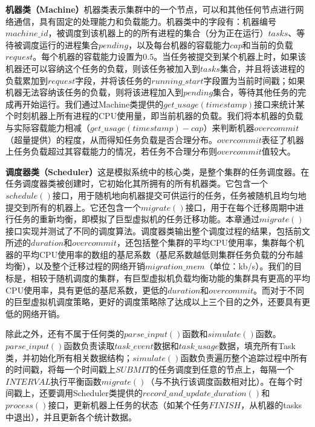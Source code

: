 \noindent\textbf{机器类（Machine）}\quad \label{chap:machine}机器类表示集群中的一个节点，可以和其他任何节点进行网络通信，具有固定的处理能力和负载能力。机器类中的字段有：机器编号$machine\_id$，被调度到该机器上的的所有进程的集合（分为正在运行）$tasks$、等待被调度运行的进程集合$pending$，以及每台机器的容载能力$cap$和当前的负载$request$。每个机器的容载能力设置为$0.5$。当任务被提交到某个机器上时，如果该机器还可以容纳这个任务的负载，则该任务被加入到$tasks$集合，并且将该进程的负载累加到$request$字段，并将该任务的$running\_start$字段置为当前时间戳；如果机器无法容纳该任务的负载，则将该进程加入到$pending$集合，等待其他任务的完成再开始运行。我们通过Machine类提供的$get\_usage(timestamp)$接口来统计某个时刻机器上所有进程的CPU使用量，即当前机器的负载。我们将本机器的负载与实际容载能力相减（$get\_usage(timestamp) - cap$）来判断机器$overcommit$（超量提供）的程度，从而得知任务负载是否合理分布。$overcommit$表征了机器上任务负载超过其容载能力的情况，若任务不合理分布则$overcommit$值较大。

\noindent\textbf{调度器类（Scheduler）}\quad \label{chap:scheduler}这是模拟系统中的核心类，是整个集群的任务调度器。在任务调度器类被创建时，它初始化其所拥有的所有机器类。它包含一个$schedule()$接口，用于随机地向机器提交可供运行的任务，任务被随机且均匀地提交到所有的机器上。它还包含一个$migrate()$接口，用于在每个迁移周期中进行任务的重新均衡，即模拟了巨型虚拟机的任务迁移功能。本章通过$migrate()$接口实现并测试了不同的调度算法。调度器类输出整个调度过程的结果，包括前文所述的$duration$和$overcommit$，还包括整个集群的平均CPU使用率，集群每个机器的平均CPU使用率的数组的基尼系数（基尼系数越低则集群任务负载的分布越均衡），以及整个迁移过程的网络开销$migration\_mem$（单位：kb/s）。我们的目标是，相较于随机调度的集群，有巨型虚拟机负载均衡功能的集群具有更高的平均CPU使用率，具有更低的基尼系数，更低的$duration$和$overcommit$。而对于不同的巨型虚拟机调度策略，更好的调度策略除了达成以上三个目的之外，还要具有更低的网络开销。

除此之外，还有不属于任何类的$parse\_input()$函数和$simulate()$函数。$parse\_input()$函数负责读取$task\_event$数据和$task\_usage$数据，填充所有Task类，并初始化所有相关数据结构；$simulate()$函数负责遍历整个追踪过程中所有的时间戳，将每一个时间戳上$SUBMIT$的任务调度到任意的节点上，每隔一个$INTERVAL$执行平衡函数$migrate()$（与不执行该调度函数相对比）。在每个时间戳上，还要调用Scheduler类提供的$record\_and\_update\_duration()$和$process()$接口，更新机器上任务的状态（如某个任务$FINISH$，从机器的tasks中退出），并且更新各个统计数据。

